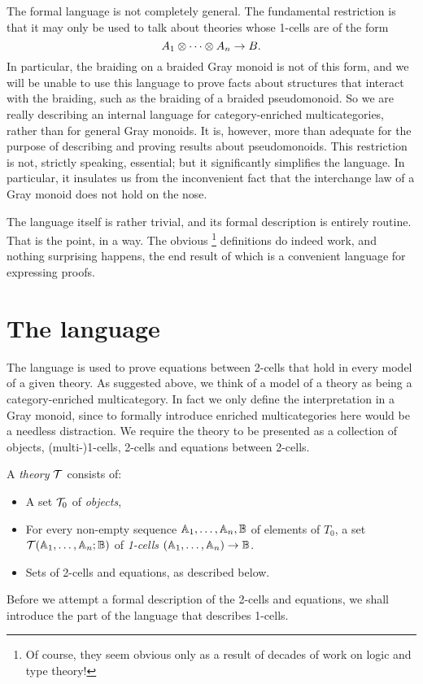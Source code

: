 \documentclass{robinthesisdraft}
\begin{document}
The formal language is not completely general. The fundamental
restriction is that it may only be used to talk about theories
whose 1-cells are of the form
\[
	A_{1}\tn\cdots\tn A_{n} \to B.
\]
In particular, the braiding on a braided Gray monoid is not of this
form, and we will be unable to use this language to prove facts about
structures that interact with the braiding, such as the braiding of
a braided pseudomonoid. So we are really describing an internal
language for category-enriched multicategories, rather than for
general Gray monoids. It is, however, more than adequate for the
purpose of describing and proving results about pseudomonoids.
%
This restriction is not, strictly speaking, essential; but it
significantly simplifies the language. In particular, it
insulates us from the inconvenient fact that the interchange
law of a Gray monoid does not hold on the nose.

The language itself is rather trivial, and its formal description
is entirely routine. That is the point, in a way. The obvious%
\footnote{Of course, they seem obvious only as a result of decades
	of work on logic and type theory!}
definitions do indeed work, and nothing surprising happens,
the end result of which is a convenient language for expressing proofs.

\section{The language}
The language is used to prove equations between 2-cells that hold in
every model of a given theory. As
suggested above, we think of a model of a theory as being a category-enriched
multicategory. 
In fact we only define the interpretation in a Gray monoid, since
to formally introduce enriched multicategories here would be a
needless distraction.
%
We require the theory to be presented as a collection
of objects, (multi-)1-cells, 2-cells and equations between 2-cells.

A \emph{theory} ${\mathcal{T}}$ consists of:
\begin{itemize}
	\item A set ${\mathcal{T}}_{0}$ of \emph{objects},
	\item For every non-empty sequence $\mathbb{A}_{1}, \ldots, \mathbb{A}_{n}, \mathbb{B}$ of
		elements of $T_{0}$,
		a set ${\mathcal{T}}(\mathbb{A}_{1},\ldots,\mathbb{A}_{n};\mathbb{B})$
		of \emph{1-cells} $(\mathbb{A}_{1}, \dots, \mathbb{A}_{n})\to \mathbb{B}$.
	\item Sets of 2-cells and equations, as described below.
\end{itemize}
Before we attempt a formal description of the 2-cells and equations,
we shall introduce the part of the language that describes 1-cells.
\end{document}
